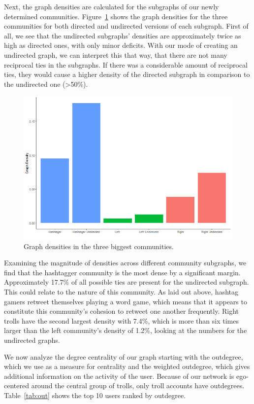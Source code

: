 \documentclass[12pt, titlepage=true, toc=bib]{scrartcl}
\begin{document}
Next, the graph densities are calculated for the subgraphs of our newly determined communities. Figure~\ref{fig:dens} shows the graph densities for the three communities for both directed and undirected versions of each subgraph. First of all, we see that the undirected subgraphs' densities are approximately twice as high as directed ones, with only minor deficits. With our mode of creating an undirected graph, we can interpret this that way, that there are not many reciprocal ties in the subgraphs. If there was a considerable amount of reciprocal ties, they would cause a higher density of the directed subgraph in comparison to the undirected one (>50\%).

\begin{figure}[!ht]
\centering
\includegraphics[width=0.95\linewidth]{final_figure3.png}
\caption[Graph densities]{Graph densities in the three biggest communities.}
\label{fig:dens}
\end{figure}

Examining the magnitude of densities across different community subgraphs, we find that the hashtagger community is the most dense by a significant margin. Approximately 17.7\% of all possible ties are present for the undirected subgraph. This could relate to the nature of this community. As laid out above, hashtag gamers retweet themselves playing a word game, which means that it appears to constitute this community's cohesion to retweet one another frequently. Right trolls have the second largest density with 7.4\%, which is more than six times larger than the left community's density of 1.2\%, looking at the numbers for the undirected graphs.

We now analyze the degree centrality of our graph starting with the outdegree, which we use as a measure for centrality and the weighted outdegree, which gives additional information on the activity of the user. Because of our network is ego-centered around the central group of trolls, only troll accounts have outdegrees. Table~\ref{tab:out} shows the top 10 users ranked by outdegree.
\end{document}
